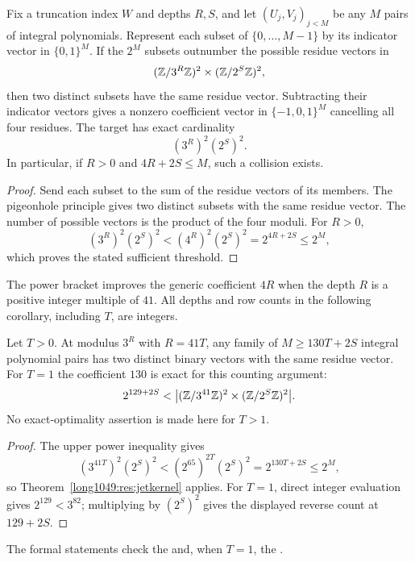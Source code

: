 \documentclass[11pt]{article}
\begin{document}
\begin{theorem}\label{long1049:res:jetkernel}
Fix a truncation index \(W\) and depths \(R,S\), and let \((U_j,V_j)_{j<M}\) be any \(M\)
pairs of integral polynomials. Represent each subset of
\(\{0,\dots,M-1\}\) by its indicator vector in \(\{0,1\}^M\).
If the \(2^M\) subsets outnumber the possible residue vectors in
\[
 (\mathbb{Z}/3^R\mathbb{Z})^2\times(\mathbb{Z}/2^S\mathbb{Z})^2,
\]
then two distinct subsets have the same residue vector.  Subtracting their
indicator vectors gives a nonzero coefficient vector in
\(\{-1,0,1\}^M\) cancelling all four residues.  The target has exact cardinality
\[
 (3^R)^2(2^S)^2.
\]
In particular, if \(R>0\) and \(4R+2S\le M\), such a collision exists.
\end{theorem}

\begin{proof}
Send each subset to the sum of the residue vectors of its members.
The pigeonhole principle gives two distinct subsets with the same
residue vector. The number of possible vectors is the product of
the four moduli.  For \(R>0\),
\[
 (3^R)^2(2^S)^2<(4^R)^2(2^S)^2=2^{4R+2S}\le2^M,
\]
which proves the stated sufficient threshold.
\end{proof}

The power bracket improves the generic coefficient $4R$ when the depth
$R$ is a positive integer multiple of $41$. All depths and row counts
in the following corollary, including $T$, are integers.

\begin{corollary}\label{long1049:res:rankfortyone}
Let $T>0$.  At modulus $3^{R}$ with $R=41T$, any family of
$M\ge130T+2S$ integral polynomial pairs has two distinct binary vectors
with the same residue vector.  For $T=1$ the coefficient $130$ is exact for
this counting argument:
\[
 2^{129+2S}<\bigl| (\mathbb{Z}/3^{41}\mathbb{Z})^2\times
                       (\mathbb{Z}/2^S\mathbb{Z})^2\bigr|.
\]
No exact-optimality assertion is made here for $T>1$.
\end{corollary}

\begin{proof}
The upper power inequality gives
\[
 (3^{41T})^2(2^S)^2
 <(2^{65})^{2T}(2^S)^2=2^{130T+2S}\le2^M,
\]
so Theorem~\ref{long1049:res:jetkernel} applies.  For $T=1$, direct integer
evaluation gives $2^{129}<3^{82}$; multiplying by $(2^S)^2$ gives the
displayed reverse count at $129+2S$.
\end{proof}

\noindent The formal statements check the
and, when $T=1$, the
.
\end{document}
